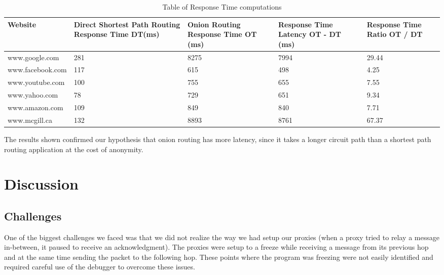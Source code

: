 \documentclass{article}
\begin{document}
\vspace{0.3 cm}
\begin{table}[]
\centering
\caption{ Table of Response Time computations}
\label{my-label}
\begin{tabular}{|K{3cm}|K{3cm}|K{2.5cm}|K{2.5cm}|K{1.5cm}|}
\hline
Website          & Direct Shortest Path Routing  Response Time  DT(ms) & Onion Routing Response Time  OT (ms) & Response Time Latency  OT - DT (ms) & Response Time Ratio  OT / DT \\ \hline
www.google.com   & 281                                      & 8275                          & 7994                         & 29.44                    \\ \hline
www.facebook.com & 117                                      & 615                           & 498                         & 4.25                    \\ \hline
www.youtube.com  & 100                                      & 755                           & 655                         & 7.55                    \\ \hline
www.yahoo.com    & 78                                       & 729                           & 651                         & 9.34                    \\ \hline
www.amazon.com   & 109                                      & 849                           & 840                         & 7.71                    \\ \hline
www.mcgill.ca    & 132                                      & 8893                          & 8761                         & 67.37                    \\ \hline
\end{tabular}
\end{table}



\vspace{0.3 cm}

\noindent The results shown confirmed our hypothesis that onion routing has more latency, since it takes a longer circuit path than a shortest path routing application at the cost of anonymity.  


\newpage
\section{Discussion}
\subsection{Challenges}
One of the biggest challenges we faced was that we did not realize the way we had setup our proxies (when a proxy tried to relay a message in-between, it paused to receive an acknowledgment). The proxies were setup to a freeze while receiving a message from its previous hop and at the same time sending the packet to the following hop. These points where the program was freezing were not easily identified and required careful use of the debugger to overcome these issues.\\
\end{document}
